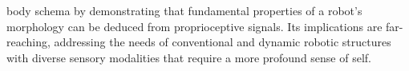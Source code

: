 body schema by demonstrating that fundamental properties of a robot's morphology can be deduced from proprioceptive signals. Its implications are far-reaching, addressing the needs of conventional and dynamic robotic structures with diverse sensory modalities that require a more profound sense of self.


